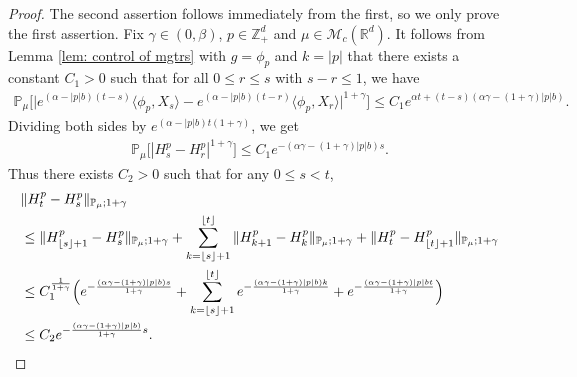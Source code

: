 \documentclass[12pt,a4paper]{amsart}
\theoremstyle{plain}
\theoremstyle{definition}
\numberwithin{equation}{section}
\begin{document}
\begin{proof}
    The second assertion follows immediately from the first, so we only prove the first assertion.
    Fix $\gamma \in (0,\beta)$, $p\in \mathbb{Z}_+^d$ and $\mu\in \mathcal M_c(\mathbb R^d)$.
    It follows from Lemma \ref{lem: control of mgtrs} with $g=\phi_p$ and $k=|p|$ that there exists a constant $C_1>0$ such that for all $0\leq r\leq s $ with $s-r\leq1$, we have
\begin{align}
    \mathbb{P}_{\mu}\Big[\big|e^{(\alpha-|p|b)(t-s)}\langle\phi_p, X_s\rangle-e^{(\alpha-|p|b)(t-r)}\langle\phi_p, X_r\rangle\big|^{1+\gamma}\Big]
    \leq C_1e^{\alpha t+(t-s)(\alpha\gamma-(1+\gamma)|p|b)}.
\end{align}
    Dividing both sides by $e^{(\alpha-|p|b) t(1+\gamma)}$, we get
\begin{align}
    \mathbb{P}_{\mu}\big[|H^p_s-H^p_r|^{1+\gamma}\big]
    \leq  C_1 e^{-(\alpha\gamma-(1+\gamma)|p|b)s}.
\end{align}
    Thus there exists $C_2>0$ such that for any $0\leq s<t$,
\begin{align}
	& \|H^p_t-H^p_s\|_{\mathbb{P}_{\mu};1+\gamma}
	\\&\leq \|H^p_{\lfloor s \rfloor+1}-H^p_s\|_{\mathbb{P}_{\mu};1+\gamma}+\sum_{k=\lfloor s \rfloor+1}^{\lfloor t \rfloor}\|H^p_{k+1}-H^p_{k}\|_{\mathbb{P}_{\mu};1+\gamma}+\|H^p_t-H^p_{\lfloor t \rfloor+1}\|_{\mathbb{P}_{\mu};1+\gamma}
	\\& \leq C_1^{\frac{1}{1+\gamma}} \Big(e^{-\frac{(\alpha \gamma-(1+\gamma)|p|b) s}{1+\gamma}}+\sum_{k=\lfloor s \rfloor+1}^{\lfloor t \rfloor}e^{-\frac{(\alpha \gamma-(1+\gamma)|p|b) k}{1+\gamma}}+ e^{-\frac{(\alpha \gamma-(1+\gamma)|p|b t}{1+\gamma}}\Big)
	\\&\leq C_2e^{-\frac{(\alpha \gamma-(1+\gamma)|p|b)}{1+\gamma}s}.
    \qedhere
\end{align}	
\end{proof}
\end{document}
